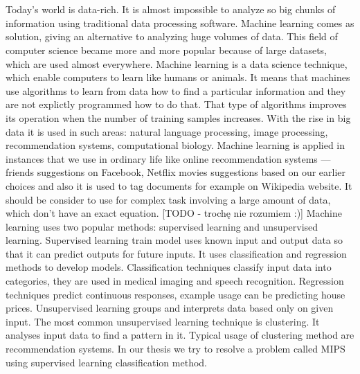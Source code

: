 \section{}

Today’s world is data-rich. It is almost impossible to analyze so big chunks of information using traditional data processing software.
Machine learning comes as solution, giving an alternative to analyzing huge volumes of data.
This field of computer science became more and more popular because of large datasets, which are used almost everywhere.
Machine learning is a data science technique, which enable computers to learn like humans or animals. It means that machines use algorithms to learn from data how to find a particular information and they are not explictly programmed how to do that.
That type of algorithms improves its operation when the number of training samples increases.
With the rise in big data it is used in such areas: natural language processing, image processing, recommendation systems, computational biology. Machine learning is applied in instances that we use in ordinary life like online recommendation systems --- friends suggestions on Facebook, Netflix movies suggestions based on our earlier choices and also it is used to tag documents for example on Wikipedia website.
It should be consider to use for complex task involving a large amount of data, which don’t have an exact equation. [TODO - trochę nie rozumiem :)]
Machine learning uses two popular methods: supervised learning and unsupervised learning.
Supervised learning train model uses known input and output data so that it can predict outputs for future inputs.
It uses classification and regression methods to develop models.
Classification techniques classify input data into categories, they are used in medical imaging and speech recognition.
Regression techniques predict continuous responses, example usage can be predicting house prices. Unsupervised learning groups and interprets data based only on given input.
The most common unsupervised learning technique is clustering.
It analyses input data to find a pattern in it. Typical usage of clustering method are recommendation systems. In our thesis we try to resolve a problem called MIPS using supervised learning classification method.
